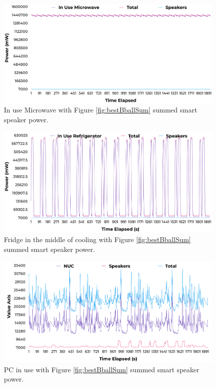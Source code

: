\begin{figure}[H]
  \centering
  \includegraphics[width=1\textwidth]{figures/inUseuWaveNoise.png}
  \caption{In use Microwave with Figure \ref{fig:bestBballSum} summed smart speaker power.}
  \label{fig:uWaveInUse}
\end{figure}

\begin{figure}[H]
  \centering
  \includegraphics[width=1\textwidth]{figures/inUseFridgeNoise.png}
  \caption{Fridge in the middle of cooling with Figure \ref{fig:bestBballSum} summed smart speaker power.}
  \label{fig:fridgeInUse}
\end{figure}

\begin{figure}[H]
  \centering
  \includegraphics[width=1\textwidth]{figures/inUseNUCNoise.png}
  \caption{PC in use with Figure \ref{fig:bestBballSum} summed smart speaker power.}
  \label{fig:nucInUse}
\end{figure}


